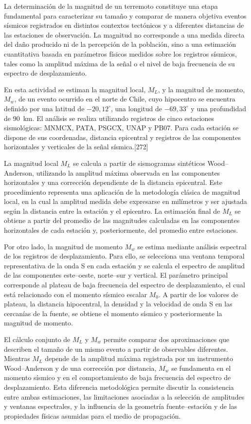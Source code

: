 \documentclass[a4paper,12pt]{article} %
\numberwithin{equation}{section} %
\numberwithin{figure}{section} %
\begin{document}
La determinación de la magnitud de un terremoto constituye una etapa fundamental para caracterizar su tamaño y comparar de manera objetiva eventos sísmicos registrados en distintos contextos tectónicos y a diferentes distancias de las estaciones de observación. La magnitud no corresponde a una medida directa del daño producido ni de la percepción de la población, sino a una estimación cuantitativa basada en parámetros físicos medidos sobre los registros sísmicos, tales como la amplitud máxima de la señal o el nivel de baja frecuencia de su espectro de desplazamiento.

En esta actividad se estiman la magnitud local, \(M_L\), y la magnitud de momento, \(M_w\), de un evento ocurrido en el norte de Chile, cuyo hipocentro se encuentra definido por una latitud de \(-20{,}12^\circ\), una longitud de \(-69{,}33^\circ\) y una profundidad de \(90\)~km. El análisis se realiza utilizando registros de cinco estaciones sismológicas: MNMCX, PATA, PSGCX, UNAP y PB07. Para cada estación se dispone de sus coordenadas, distancia epicentral y registros de las componentes horizontales y verticales de la señal sísmica.[272]

La magnitud local \(M_L\) se calcula a partir de sismogramas sintéticos Wood--Anderson, utilizando la amplitud máxima observada en las componentes horizontales y una corrección dependiente de la distancia epicentral. Este procedimiento representa una aplicación de la metodología clásica de magnitud local, en la cual la amplitud medida debe expresarse en milímetros y ser ajustada según la distancia entre la estación y el epicentro. La estimación final de \(M_L\) se obtiene a partir del promedio de las magnitudes calculadas en las componentes horizontales de cada estación y, posteriormente, del promedio entre estaciones.

Por otro lado, la magnitud de momento \(M_w\) se estima mediante análisis espectral de los registros de desplazamiento. Para ello, se selecciona una ventana temporal representativa de la onda S en cada estación y se calcula el espectro de amplitud de las componentes este--oeste, norte--sur y vertical. El parámetro principal corresponde al plateau de baja frecuencia del espectro de desplazamiento, el cual está relacionado con el momento sísmico escalar \(M_0\). A partir de los valores de plateau, la distancia hipocentral, la densidad y la velocidad de onda S en las cercanías de la fuente, se obtiene el momento sísmico y posteriormente la magnitud de momento.

El cálculo conjunto de \(M_L\) y \(M_w\) permite comparar dos aproximaciones que describen el tamaño de un mismo evento a partir de observables diferentes. Mientras \(M_L\) depende de la amplitud máxima registrada por un instrumento Wood--Anderson y de una corrección por distancia, \(M_w\) se fundamenta en el momento sísmico y en el comportamiento de baja frecuencia del espectro de desplazamiento. Esta diferencia metodológica permite discutir la consistencia entre ambas estimaciones, las limitaciones asociadas a la selección de amplitudes y ventanas espectrales, y la influencia de la geometría fuente--estación y de las propiedades físicas asumidas para el medio de propagación.
\end{document}
